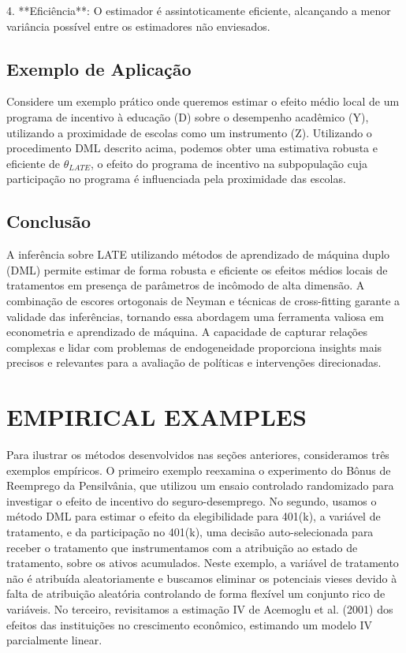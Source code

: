 \documentclass[a4paper,12pt]{article}[abntex2]
\begin{document}
4. **Eficiência**: O estimador é assintoticamente eficiente, alcançando a menor variância possível entre os estimadores não enviesados.

\subsection*{Exemplo de Aplicação}

Considere um exemplo prático onde queremos estimar o efeito médio local de um programa de incentivo à educação (D) sobre o desempenho acadêmico (Y), utilizando a proximidade de escolas como um instrumento (Z). Utilizando o procedimento DML descrito acima, podemos obter uma estimativa robusta e eficiente de $\theta_{LATE}$, o efeito do programa de incentivo na subpopulação cuja participação no programa é influenciada pela proximidade das escolas.

\subsection*{Conclusão}

A inferência sobre LATE utilizando métodos de aprendizado de máquina duplo (DML) permite estimar de forma robusta e eficiente os efeitos médios locais de tratamentos em presença de parâmetros de incômodo de alta dimensão. A combinação de escores ortogonais de Neyman e técnicas de cross-fitting garante a validade das inferências, tornando essa abordagem uma ferramenta valiosa em econometria e aprendizado de máquina. A capacidade de capturar relações complexas e lidar com problemas de endogeneidade proporciona insights mais precisos e relevantes para a avaliação de políticas e intervenções direcionadas.

\newpage

\section{EMPIRICAL EXAMPLES}

Para ilustrar os métodos desenvolvidos nas seções anteriores, consideramos três exemplos empíricos. O primeiro exemplo reexamina o experimento do Bônus de Reemprego da Pensilvânia, que utilizou um ensaio controlado randomizado para investigar o efeito de incentivo do seguro-desemprego. No segundo, usamos o método DML para estimar o efeito da elegibilidade para 401(k), a variável de tratamento, e da participação no 401(k), uma decisão auto-selecionada para receber o tratamento que instrumentamos com a atribuição ao estado de tratamento, sobre os ativos acumulados. Neste exemplo, a variável de tratamento não é atribuída aleatoriamente e buscamos eliminar os potenciais vieses devido à falta de atribuição aleatória controlando de forma flexível um conjunto rico de variáveis. No terceiro, revisitamos a estimação IV de Acemoglu et al. (2001) dos efeitos das instituições no crescimento econômico, estimando um modelo IV parcialmente linear.
\end{document}
